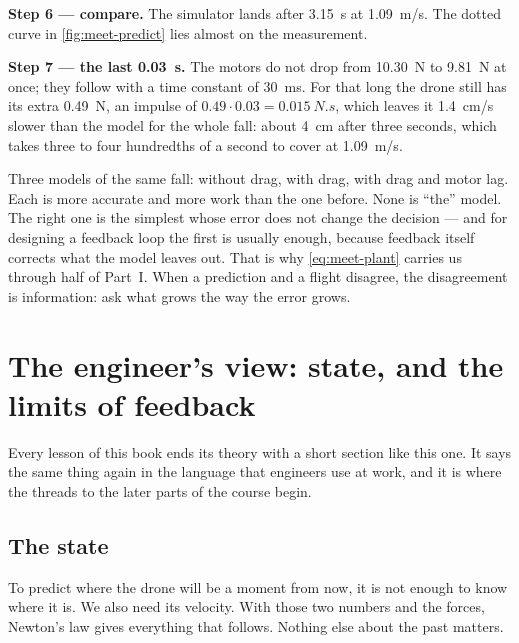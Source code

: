 \begin{example}
\textbf{Step 6 — compare.} The simulator lands after \SI{3.15}{s} at \SI{1.09}{m/s}. The dotted curve in \cref{fig:meet-predict} lies almost on the measurement.

\textbf{Step 7 — the last \SI{0.03}{s}.} The motors do not drop from \SI{10.30}{N} to \SI{9.81}{N} at once; they follow with a time constant of \SI{30}{ms}. For that long the drone still has its extra \SI{0.49}{N}, an impulse of $0.49 \cdot 0.03 = \SI{0.015}{N.s}$, which leaves it \SI{1.4}{cm/s} slower than the model for the whole fall: about \SI{4}{cm} after three seconds, which takes three to four hundredths of a second to cover at \SI{1.09}{m/s}.
\end{example}

\begin{keyidea}
Three models of the same fall: without drag, with drag, with drag and motor lag. Each is more accurate and more work than the one before. None is \enquote{the} model. The right one is the simplest whose error does not change the decision — and for designing a feedback loop the first is usually enough, because feedback itself corrects what the model leaves out. That is why \cref{eq:meet-plant} carries us through half of Part~I. When a prediction and a flight disagree, the disagreement is information: ask what grows the way the error grows.
\end{keyidea}

\section{The engineer's view: state, and the limits of feedback}

Every lesson of this book ends its theory with a short section like this one. It says the same thing again in the language that engineers use at work, and it is where the threads to the later parts of the course begin.

\subsection{The state}
To predict where the drone will be a moment from now, it is not enough to know where it is. We also need its velocity. With those two numbers and the forces, Newton's law gives everything that follows. Nothing else about the past matters.

